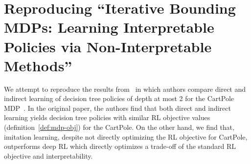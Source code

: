 \section{Reproducing ``Iterative Bounding MDPs: Learning Interpretable Policies via Non-Interpretable Methods''}\label{sec:reprod}


\begin{algorithm}
    
    
    \caption{Extract a decision tree policy: algorithm 1 from~\cite{topin2021iterative}}\label{alg:extract-tree}
\end{algorithm}

We attempt to reproduce the results from~\cite{topin2021iterative} in which authors compare direct and indirect learning of decision tree policies of depth at most 2 for the CartPole MDP~\citep{cartpole}.
In the original paper, the authors find that both direct and indirect learning yields decision tree policies with similar RL objective values (definition~\ref{def:mdp-obj}) for the CartPole.
On the other hand, we find that, imitation learning, despite not directly optimizing the RL objective for CartPole, outperforms deep RL which directly optimizes a trade-off of the standard RL objective and interpretability.

